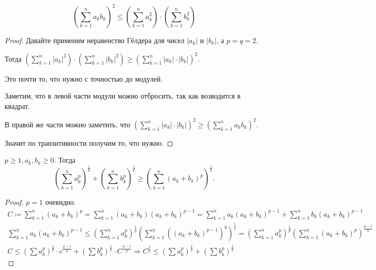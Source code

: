 \begin{consequence}
    \[\left(\sum_{k=1}^n a_k b_k\right)^2 \le \left(\sum_{k=1}^n a_k^2\right) \cdot \left(\sum_{k=1}^n b_k^2\right)\]
\end{consequence}
\begin{proof}
    Давайте применим неравенство Гёлдера для чисел $|a_k|$ и $|b_k|$, а $p = q = 2$.
    
    Тогда $\left(\sum_{k=1}^n |a_k|^2\right) \cdot \left(\sum_{k=1}^n |b_k|^2\right) \ge \left(\sum_{k=1}^n |a_k| \cdot |b_k|\right)^2$.
    
    Это почти то, что нужно с точностью до модулей. 
    
    Заметим, что в левой части модули можно отбросить, так как возводится в квадрат. 
    
    В правой же части можно заметить, что $\left(\sum_{k=1}^n |a_k|\cdot|b_k|\right)^2 \ge \left(\sum_{k=1}^n a_k b_k\right)^2$.
    
    Значит по транзитивности получим то, что нужно.
\end{proof}

\begin{consequence}
    $p \ge 1, a_k, b_k \ge 0$. Тогда \[
        \left(\sum_{k=1}^n a_k^p\right)^{\frac{1}{p}} + \left(\sum_{k=1}^n b_k^p \right)^{\frac{1}{p}} \ge \left(\sum_{k=1}^n (a_k + b_k)^p\right)^{\frac{1}{p}}
    .\] 
\end{consequence}
\begin{proof}
    $p = 1$ очевидно. 
    \begin{align*}
        C \coloneqq \sum_{k=1}^n (a_k+b_k)^p = \sum_{k=1}^n (a_k+b_k)(a_k+b_k)^{p-1} = \sum_{k=1}^n a_k(a_k+b_k)^{p-1} + \sum_{k=1}^n b_k(a_k+b_k)^{p-1} \\
        \sum_{k=1}^n a_k(a_k + b_k)^{p-1} \le (\sum_{k=1}^n a_k^p)^{\frac{1}{p}} (\sum_{k=1}^n((a_k + b_k)^{p-1})^{q})^{\frac{1}{q}} = (\sum_{k=1}^n a_k^p)^{\frac{1}{p}}(\sum_{k=1}^n(a_k+b_k)^p)^{\frac{p-1}{n}} \\
        C \le (\sum a_k^p)^{\frac{1}{p}} \cdot c^{\frac{p-1}{p}} + (\sum b_k^p)^{\frac{1}{p}} \cdot C^{\frac{p-1}{p}} \Rightarrow C^{\frac{1}{p}} \le (\sum a_k^p)^{\frac{1}{p}} + (\sum b_k^p)^{\frac{1}{p}}
    \end{align*}
\end{proof}
